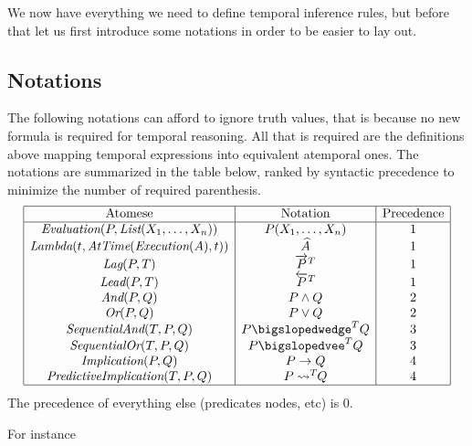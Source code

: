 \documentclass[runningheads]{llncs}
\newcommand{\SP}{\;\;\;}
\newcommand{\TEval}{\textit{Evaluation}}
\newcommand{\TList}{\textit{List}}
\newcommand{\TLamb}{\textit{Lambda}}
\newcommand{\TExec}{\textit{Execution}}
\newcommand{\TAtTime}{\textit{AtTime}}
\newcommand{\TAnd}{\textit{And}}
\newcommand{\TOr}{\textit{Or}}
\newcommand{\TImpl}{\textit{Implication}}
\newcommand{\TPredImpl}{\textit{PredictiveImplication}}
\newcommand{\TSeqAnd}{\textit{SequentialAnd}}
\newcommand{\TSeqOr}{\textit{SequentialOr}}
\newcommand{\TLag}{\textit{Lag}}
\newcommand{\TLead}{\textit{Lead}}
\newcommand{\TTV}{\textit{TV}}
\newcommand{\TBTV}{\langle \TTV \rangle}
\newcommand{\limp}{\rightarrow}
\newcommand{\lpreimp}[1]{\leadsto^{#1}}
\newcommand{\lseqor}[1]{\bigslopedvee^{#1}}
\newcommand{\lseqand}[1]{\bigslopedwedge^{#1}}
\newcommand{\ldo}[1]{\widehat{#1}}
\newcommand{\llag}[2]{\overrightarrow{#1}^{#2}}
\newcommand{\llead}[2]{\overleftarrow{#1}^{#2}}
\begin{document}
We now have everything we need to define temporal inference rules, but
before that let us first introduce some notations in order to be
easier to lay out.

\subsection{Notations}

The following notations can afford to ignore truth values, that is
because no new formula is required for temporal reasoning.  All that
is required are the definitions above mapping temporal expressions
into equivalent atemporal ones.  The notations are summarized in the
table below, ranked by syntactic precedence to minimize the number of
required parenthesis.
\renewcommand{\arraystretch}{1.5}
$$
\begin{array}{|c|c|c|}
  \hline
  \text{Atomese} & \text{Notation} & \text{Precedence} \\
  \hline
  \TEval(P, \TList(X_1, \dots, X_n)) & P(X_1, \dots, X_n) & 1 \\
  \TLamb(t, \TAtTime(\TExec(A), t)) & \ldo{A} & 1 \\
  \TLag(P, T) & \llag{P}{T} & 1 \\
  \TLead(P, T) & \llead{P}{T} & 1 \\
  \TAnd(P, Q) & P \land Q & 2 \\
  \TOr(P, Q) & P \lor Q & 2 \\
  \TSeqAnd(T, P, Q) & P \lseqand{T} Q & 3 \\
  \TSeqOr(T, P, Q) & P \lseqor{T} Q & 3 \\
  \TImpl(P, Q) & P \limp Q & 4 \\
  \TPredImpl(T, P, Q) & P \lpreimp{T} \! \! Q & 4 \\
  \hline
\end{array}
$$
\renewcommand{\arraystretch}{1}
The precedence of everything else (predicates nodes, etc) is 0.


For instance

\end{document}
